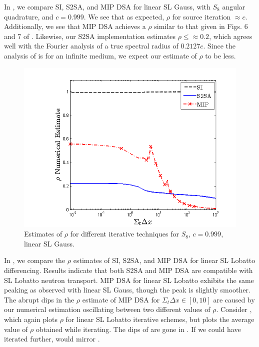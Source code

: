 In , we compare SI, S2SA, and MIP DSA for linear SL Gauss, with $S_8$ angular quadrature, and $c=0.999$.
We see that as expected\cite{larsen_dsa}, $\rho$ for source iteration $\approx c$.  
Additionally, we see that MIP DSA achieves a $\rho$ similar to that given in Figs. 6 and 7 of \cite{mip_dsa}.
Likewise, our S2SA implementation estimates $\rho \leq \approx 0.2$, which agrees well with the Fourier analysis of \cite{s2sa} a true spectral radius of $0.2127c$.  Since the analysis of \cite{s2sa} is for an infinite medium, we expect our estimate of $\rho$ to be less.
\begin{figure}[!hbp]
\centering
\includegraphics[width=12cm]{chapter4_acceleration/Constant_XS_SN8_P1_Gauss_Solvers.png}
\caption{Estimates of $\rho$ for different iterative techniques for $S_8$, $c=0.999$, linear SL Gauss.}
\label{fig:p1_gauss}
\end{figure}
\vfill{}
\pagebreak
\noindent In , we compare the $\rho$ estimates of SI, S2SA, and MIP DSA for linear SL Lobatto differencing.  Results indicate that both S2SA and MIP DSA are compatible with SL Lobatto neutron transport.
MIP DSA for linear SL Lobatto exhibits the same peaking as observed with linear SL Gauss, though the peak is slightly smoother. 
The abrupt dips in the $\rho$ estimate of MIP DSA for $\Sigma_t \Delta x \in[0,10]$ are caused by our numerical estimation oscillating between two different values of $\rho$.
Consider , which again plots $\rho$ for linear SL Lobatto iterative schemes, but plots the average value of $\rho$ obtained while iterating.
The dips of  are gone in .
If we could have iterated further,  would mirror .
